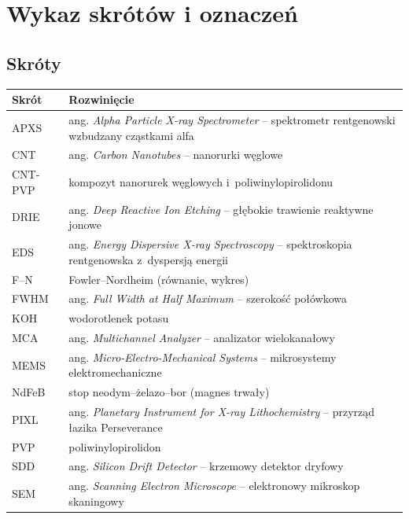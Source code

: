 \chapter*{Wykaz skrótów i oznaczeń}


\section*{Skróty}

\begin{tabular}{@{}lp{}@{}}
\toprule
\textbf{Skrót} & \textbf{Rozwinięcie} \\
\midrule
APXS    & ang. \textit{Alpha Particle X-ray Spectrometer} -- spektrometr rentgenowski wzbudzany cząstkami alfa \\
CNT     & ang. \textit{Carbon Nanotubes} -- nanorurki węglowe \\
CNT-PVP & kompozyt nanorurek węglowych i~poliwinylopirolidonu \\
DRIE    & ang. \textit{Deep Reactive Ion Etching} -- głębokie trawienie reaktywne jonowe \\
EDS     & ang. \textit{Energy Dispersive X-ray Spectroscopy} -- spektroskopia rentgenowska z~dyspersją energii \\
F--N    & Fowler--Nordheim (równanie, wykres) \\
FWHM    & ang. \textit{Full Width at Half Maximum} -- szerokość połówkowa \\
KOH     & wodorotlenek potasu \\
MCA     & ang. \textit{Multichannel Analyzer} -- analizator wielokanałowy \\
MEMS    & ang. \textit{Micro-Electro-Mechanical Systems} -- mikrosystemy elektromechaniczne \\
NdFeB   & stop neodym--żelazo--bor (magnes trwały) \\
PIXL    & ang. \textit{Planetary Instrument for X-ray Lithochemistry} -- przyrząd łazika Perseverance \\
PVP     & poliwinylopirolidon \\
SDD     & ang. \textit{Silicon Drift Detector} -- krzemowy detektor dryfowy \\
SEM     & ang. \textit{Scanning Electron Microscope} -- elektronowy mikroskop skaningowy \\

\end{tabular}
